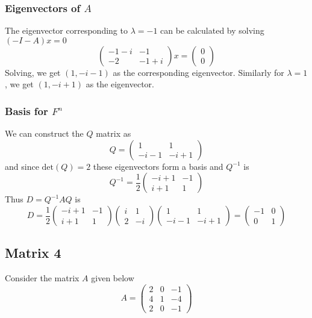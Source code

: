 \documentclass{article}[12pt]
\begin{document}
\subsubsection{Eigenvectors of $A$}
The eigenvector corresponding to $\lambda=-1$ can be calculated by
solving $(-I-A)x=0$
\[
\begin{pmatrix}
-1-i & -1 \\
-2 & -1+i
\end{pmatrix}x = \begin{pmatrix} 0 \\ 0 \end{pmatrix}
\]
Solving, we get $(1,-i-1)$ as the corresponding eigenvector.
Similarly for $\lambda=1$,  we get $(1,-i+1)$ as the eigenvector.

\subsubsection{Basis for $F^n$}
We can construct the $Q$ matrix as
\[
Q = \begin{pmatrix} 1 & 1 \\ -i-1 & -i+1 \end{pmatrix}
\]
and since $\textrm{det}(Q)=2$ these eigenvectors form a basis and $Q^{-1}$ is
\[
Q^{-1} = \frac{1}{2}\begin{pmatrix} -i+1 & -1 \\ i+1 & 1 \end{pmatrix}
\]
Thus $D=Q^{-1}AQ$ is
\[
D = \frac{1}{2}\begin{pmatrix} -i+1 & -1 \\ i+1 & 1 \end{pmatrix}
\begin{pmatrix}  i & 1 \\ 2 & -i \end{pmatrix}
\begin{pmatrix} 1 & 1 \\ -i-1 & -i+1 \end{pmatrix}
= \begin{pmatrix} -1 & 0 \\ 0 & 1 \end{pmatrix}
\]

\subsection{Matrix 4}
Consider the matrix $A$ given below
\[
A = \begin{pmatrix} 2 & 0 & -1 \\ 4 & 1 & -4 \\ 2 & 0 & -1 \end{pmatrix}
\]
\end{document}
